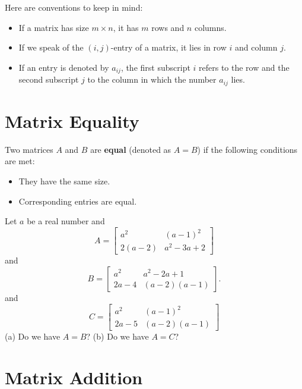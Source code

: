 \documentclass[20pt,a4paper]{extarticle}
\newcounter{example}[section]
\newcounter{definition}[section]
\begin{document}
Here are conventions to keep in mind:
\begin{itemize}
	\item If a matrix has size $m \times n$, it has $m$ rows and $n$ columns.
	\item If we speak of the $(i, j)$-entry of a matrix, it lies in row $i$ and column $j$.
	\item If an entry is denoted by $a_{ij}$, the first subscript $i$ refers to the row and the second subscript $j$ to the column in which the number $a_{ij}$ lies.
\end{itemize}

\newpage 

\section{Matrix Equality}

\begin{definition}
Two matrices $A$ and $B$ are \textbf{equal} (denoted as $A = B$) if the following conditions are met:
	\begin{itemize}
		\item They have the same size.
		\item Corresponding entries are equal.
	\end{itemize}
\end{definition}

\begin{example}
Let $a$ be a real number and
	\[
		A = \begin{bmatrix} a^2 & (a - 1)^2 \\ 2 (a - 2) & a^2 - 3a + 2 \end{bmatrix} 
	\] 
and 
	\[
		B = \begin{bmatrix} a^2 & a^2 - 2a + 1 \\ 2a - 4 & (a - 2) (a - 1) \end{bmatrix}.
	\]
and
	\[
		C = \begin{bmatrix} a^2 & (a - 1)^2 \\ 2a - 5 & (a - 2) (a - 1) \end{bmatrix}
	\]
(a) Do we have $A = B$? (b) Do we have $A = C$?
\end{example}

\begin{solution}

\end{solution}

\newpage

\section{Matrix Addition}
\end{document}
